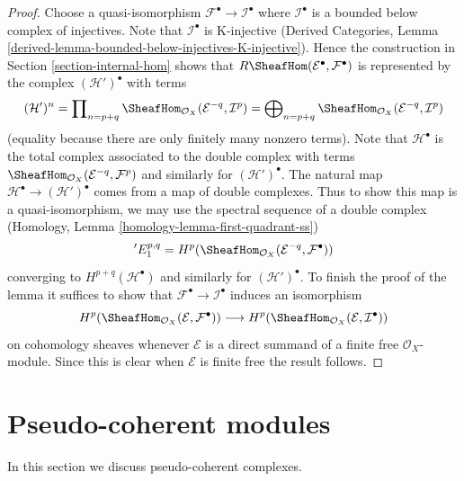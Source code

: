 \begin{proof}
Choose a quasi-isomorphism $\mathcal{F}^\bullet \to \mathcal{I}^\bullet$
where $\mathcal{I}^\bullet$ is a bounded below complex of injectives.
Note that $\mathcal{I}^\bullet$ is K-injective
(Derived Categories, Lemma
\ref{derived-lemma-bounded-below-injectives-K-injective}).
Hence the construction in Section \ref{section-internal-hom}
shows that
$R\SheafHom(\mathcal{E}^\bullet, \mathcal{F}^\bullet)$ is 
represented by the complex $(\mathcal{H}')^\bullet$ with terms
$$
(\mathcal{H}')^n =
\prod\nolimits_{n = p + q}
\SheafHom_{\mathcal{O}_X}(\mathcal{E}^{-q}, \mathcal{I}^p) =
\bigoplus\nolimits_{n = p + q}
\SheafHom_{\mathcal{O}_X}(\mathcal{E}^{-q}, \mathcal{I}^p)
$$
(equality because there are only finitely many nonzero terms).
Note that $\mathcal{H}^\bullet$ is the total complex associated to
the double complex with terms
$\SheafHom_{\mathcal{O}_X}(\mathcal{E}^{-q}, \mathcal{F}^p)$
and similarly for $(\mathcal{H}')^\bullet$.
The natural map $\mathcal{H}^\bullet \to (\mathcal{H}')^\bullet$
comes from a map of double complexes.
Thus to show this map is a quasi-isomorphism, we may use the spectral
sequence of a double complex
(Homology, Lemma \ref{homology-lemma-first-quadrant-ss})
$$
{}'E_1^{p, q} =
H^p(\SheafHom_{\mathcal{O}_X}(\mathcal{E}^{-q}, \mathcal{F}^\bullet))
$$
converging to $H^{p + q}(\mathcal{H}^\bullet)$ and similarly for
$(\mathcal{H}')^\bullet$. To finish the proof of the lemma it
suffices to show that $\mathcal{F}^\bullet \to \mathcal{I}^\bullet$
induces an isomorphism
$$
H^p(\SheafHom_{\mathcal{O}_X}(\mathcal{E}, \mathcal{F}^\bullet))
\longrightarrow
H^p(\SheafHom_{\mathcal{O}_X}(\mathcal{E}, \mathcal{I}^\bullet))
$$
on cohomology sheaves whenever $\mathcal{E}$ is a direct summand of a
finite free $\mathcal{O}_X$-module. Since this is clear when $\mathcal{E}$
is finite free the result follows.
\end{proof}





\section{Pseudo-coherent modules}
\label{section-pseudo-coherent}

\noindent
In this section we discuss pseudo-coherent complexes.

